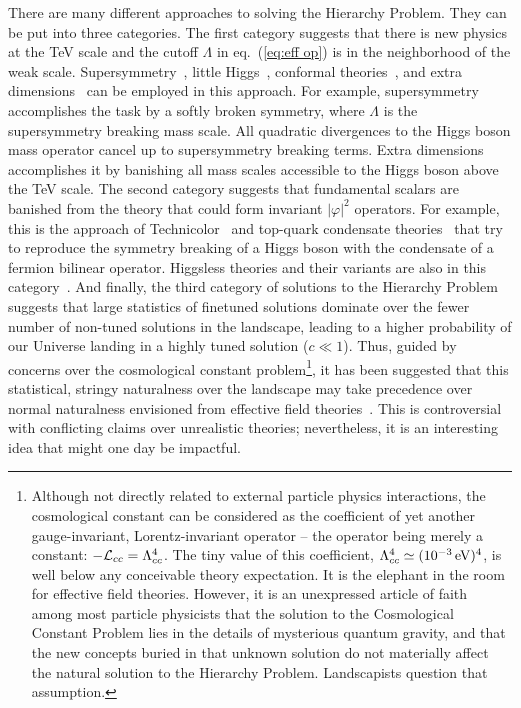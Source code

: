 \documentclass[12pt]{article}
\def\eq#1{eq.~(\ref{#1})}
\begin{document}
There are many different approaches to solving the Hierarchy Problem. They can be put into three categories. The first category suggests that  there is new physics at the TeV scale and the cutoff $\Lambda$ in \eq{eq:eff op} is in the neighborhood of the weak scale. Supersymmetry~\cite{Martin:1997ns}, little Higgs~\cite{little higgs}, conformal theories~\cite{conformal}, and extra dimensions~\cite{xdim reviews} can be employed in this approach. For example, supersymmetry accomplishes the task by a softly broken symmetry, where $\Lambda$ is the supersymmetry breaking mass scale. All quadratic divergences to the Higgs boson mass operator cancel up to supersymmetry breaking terms. Extra dimensions accomplishes it by banishing all mass scales accessible to the Higgs boson above the TeV scale.  The second category suggests that  fundamental scalars are banished from the theory that could form invariant $|\varphi|^2$ operators. For example, this is the approach of Technicolor~\cite{Lane:2009ct} and top-quark condensate theories~\cite{top condensate} that try to reproduce the symmetry breaking of a Higgs boson with the condensate of a fermion bilinear operator. Higgsless theories and their variants are also in this category~\cite{higgsless}. And finally, the third category of solutions to the Hierarchy Problem suggests that large statistics of finetuned solutions dominate over the fewer number of non-tuned solutions in the landscape, leading to a higher probability of our Universe landing in a highly tuned solution ($c\ll 1$). Thus, guided by concerns over the cosmological constant problem\footnote{Although not directly related to external particle physics interactions, the cosmological constant can be considered as the coefficient of yet another gauge-invariant, Lorentz-invariant operator -- the operator being merely a constant: $-{\cal L}_{cc}=\Lambda_{cc}^4$.  The tiny value of this coefficient, $\Lambda^4_{cc}\simeq (10^{-3}\, {\rm eV})^4$, is well below any conceivable theory expectation. It is the elephant in the room for effective field theories. However, it is an unexpressed article of faith among most particle physicists that the solution to the Cosmological Constant Problem lies in the details of mysterious quantum gravity, and that the new concepts buried in that unknown solution do not materially affect the natural solution to the Hierarchy Problem. Landscapists question that assumption.}, it has been suggested that this statistical, stringy naturalness  over the landscape may take precedence over normal naturalness envisioned from effective field theories~\cite{Douglas:2006es}. This is controversial with conflicting claims over unrealistic theories; nevertheless, it is an interesting idea that might one day be impactful. 
\end{document}
